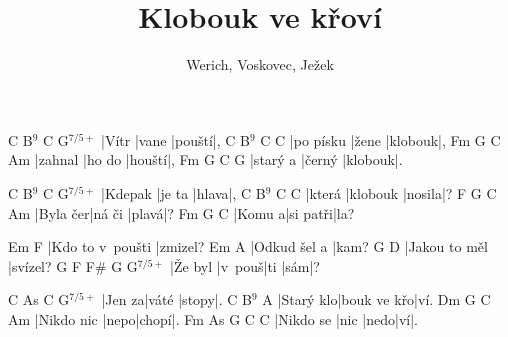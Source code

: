 \documentclass{song}
\title{Klobouk ve křoví}
\author{Werich, Voskovec, Ježek}
\newcommand{\9}{$^9$}
\newcommand{\aug}{$^{7/5+}$}
\begin{document}
\strophe
C     B\9   C      G\aug
|Vítr |vane |pouští|,
C         B\9   C       C\7
|po písku |žene |klobouk|,
Fm      G\7    C      Am
|zahnal |ho do |houští|,
Fm       G\7    C       G\7
|starý a |černý |klobouk|.
\endstrophe

\strophe
C       B\9    C     G\aug
|Kdepak |je ta |hlava|,
C      B\9      C      C\7
|která |klobouk |nosila|?
F        G\7    C     Am
|Byla čer|ná či |plavá|?
Fm     G\7      C
|Komu a|si patři|la?
\endstrophe

\strophe
Em               F
|Kdo to v~poušti |zmizel?
Em           A\7
|Odkud šel a |kam?
G             D\7
|Jakou to měl |svízel?
G       F\7    F\#\7 G\7 G\aug
|Že byl |v~pouš|ti   |sám|?
\endstrophe

\strophe
C      As    C     G\aug
|Jen za|váté |stopy|.
C         B\9         A\7
|Starý klo|bouk ve křo|ví.
Dm         G\7  C     Am
|Nikdo nic |nepo|chopí|.
Fm        As\7 G\7  C  C\6
|Nikdo se |nic |nedo|ví|.
\endstrophe

\end{document}
